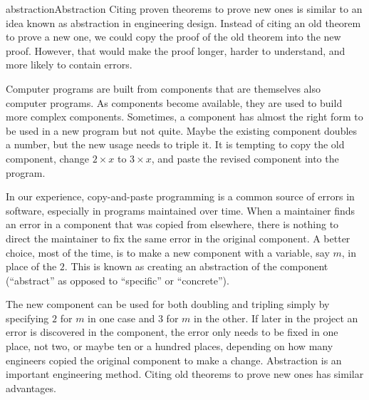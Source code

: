 \begin{aside}{abstraction}{Abstraction}
Citing proven theorems to prove new ones
is similar to an idea known as
abstraction
in engineering design.
Instead of citing an old theorem to prove a new one,
we could copy the proof of the old theorem into the new proof.
However, that would make the proof longer, harder to understand,
and more likely to contain errors.

Computer programs are built from components that are themselves
also computer programs. As components become available,
they are used to build more complex components.
Sometimes, a component has almost the right form
to be used in a new program but not quite.
Maybe the existing component doubles a number,
but the new usage needs to triple it.
It is tempting to copy the
old component, change $2 \times x$ to $3 \times x$,
and paste the revised component into the program.

In our experience, copy-and-paste
programming is a common source of errors in software,
especially in programs maintained
over time. When a maintainer finds an error in
a component that was copied from elsewhere,
there is nothing to direct the maintainer to fix
the same error in the original component.
A better choice, most of the time,
is to make a new component with
a variable, say $m$, in place of the $2$.
This is known as creating an abstraction of the component
(``abstract'' as opposed to ``specific'' or ``concrete'').

The new component can be used for both doubling and tripling
simply by specifying $2$ for $m$ in one case and $3$ for $m$ in the other.
If later in the project an error is discovered in the component,
the error only needs to be fixed in one place, not two,
or maybe ten or a hundred places, depending on how many engineers
copied the original component to make a change.
Abstraction is an important engineering method.
Citing old theorems to prove new ones has similar advantages.
\end{aside}


